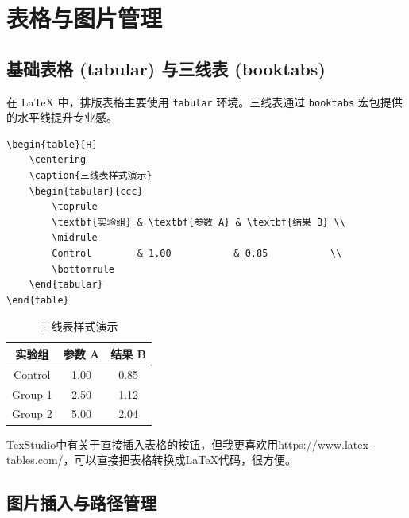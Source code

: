 \chapter{表格与图片管理}

\section{基础表格 (tabular) 与三线表 (booktabs)}

在 \LaTeX{} 中，排版表格主要使用 \texttt{tabular} 环境。三线表通过 \texttt{booktabs} 宏包提供的水平线提升专业感。

\begin{lstlisting}[language={[LaTeX]TeX}, caption={三线表源码}, frame=single]
\begin{table}[H]
    \centering
    \caption{三线表样式演示}
    \begin{tabular}{ccc}
        \toprule
        \textbf{实验组} & \textbf{参数 A} & \textbf{结果 B} \\
        \midrule
        Control        & 1.00           & 0.85           \\
        \bottomrule
    \end{tabular}
\end{table}
\end{lstlisting}

\begin{table}[H]
    \centering
    \caption{三线表样式演示}
    \begin{tabular}{ccc}
        \toprule
        \textbf{实验组} & \textbf{参数 A} & \textbf{结果 B} \\
        \midrule
        Control        & 1.00           & 0.85           \\
        Group 1        & 2.50           & 1.12           \\
        Group 2        & 5.00           & 2.04           \\
        \bottomrule
    \end{tabular}
\end{table}

TexStudio中有关于直接插入表格的按钮，但我更喜欢用https://www.latex-tables.com/，可以直接把表格转换成\LaTeX 代码，很方便。
\section{图片插入与路径管理}

